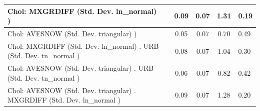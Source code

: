 \begin{table}
\begin{center}
\begin{tabular}{|l|l|c|c|c|l|}
			\hline
			 Chol: MXGRDIFF (Std. Dev. ln_normal) ) &  & 0.09 & 0.07 & 1.31 & 0.19 \\
			\hline
			 Chol: AVESNOW (Std. Dev. triangular) ) &  & 0.05 & 0.07 & 0.70 & 0.49 \\
			\hline
			 Chol: MXGRDIFF (Std. Dev. ln_normal) . URB (Std. Dev.   tn_normal ) &  & 0.08 & 0.07 & 1.04 & 0.30 \\
			\hline
			 Chol: AVESNOW (Std. Dev. triangular) . URB (Std. Dev.   tn_normal ) &  & 0.06 & 0.07 & 0.82 & 0.42 \\
			\hline
			 Chol: AVESNOW (Std. Dev. triangular) . MXGRDIFF (Std. Dev.   ln_normal ) &  & 0.09 & 0.07 & 1.28 & 0.20 \\
			\hline
		\end{tabular}
	\end{center}
\end{table}